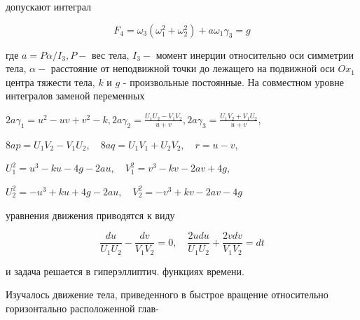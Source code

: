 \documentclass[10pt]{article}
\begin{document}
допускают интеграл



\[

F_{4}=\omega_{3}\left(\omega_{1}^{2}+\omega_{2}^{2}\right)+a \omega_{1} \gamma_{3}=g

\]



где $a=P \alpha / I_{3}, P-$ вес тела, $I_{3}-$ момент инерции относительно оси симметрии тела, $\alpha-$ расстояние от неподвижной точки до лежащего на подвижной оси $O x_{1}$ центра тяжести тела, $k$ и $g$ - произвольные постоянные. На совместном уровне интегралов заменой переменных



$2 a \gamma_{1}=u^{2}-u v+v^{2}-k, 2 a \gamma_{2}=\frac{U_{1} U_{2}-V_{1} V_{2}}{u+v}, 2 a \gamma_{3}=\frac{U_{1} V_{2}+V_{1} U_{2}}{u+v}$,



$8 a p=U_{1} V_{2}-V_{1} U_{2}, \quad 8 a q=U_{1} V_{1}+U_{2} V_{2}, \quad r=u-v$,



$U_{1}^{2}=u^{3}-k u-4 g-2 a u, \quad V_{1}^{2}=v^{3}-k v-2 a v+4 g$,



$U_{2}^{2}=-u^{3}+k u+4 g-2 a u, \quad V_{2}^{2}=-v^{3}+k v-2 a v-4 g$



уравнения движения приводятся к виду



\[

\frac{d u}{U_{1} U_{2}}-\frac{d v}{V_{1} V_{2}}=0, \quad \frac{2 u d u}{U_{1} U_{2}}+\frac{2 v d v}{V_{1} V_{2}}=d t

\]



и задача решается в гиперэллиптич. функциях времени.



Изучалось движение тела, приведенного в быстрое вращение относительно горизонтально расположенной глав-
\end{document}
